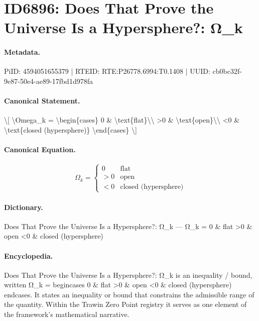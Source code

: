 \section*{ID6896: Does That Prove the Universe Is a Hypersphere?: Ω\_k}
\paragraph{Metadata.}
PiID: 4594051655379 | RTEID: RTE:P26778.6994:T0.1408 | UUID: cb0bc32f-9e87-50e4-ae89-17fbd1d978fa

\paragraph{Canonical Statement.}
\textbackslash{}[ \textbackslash{}Omega\_k = \textbackslash{}begin\{cases\} 0 \& \textbackslash{}text\{flat\}\textbackslash{}\textbackslash{} >0 \& \textbackslash{}text\{open\}\textbackslash{}\textbackslash{} <0 \& \textbackslash{}text\{closed (hypersphere)\} \textbackslash{}end\{cases\} \textbackslash{}]

\paragraph{Canonical Equation.}
\[
\Omega_k = \begin{cases} 0 & \text{flat}\\ >0 & \text{open}\\ <0 & \text{closed (hypersphere)} \end{cases}
\]

\paragraph{Dictionary.}
Does That Prove the Universe Is a Hypersphere?: Ω\_k — Ω\_k = 0 \& flat >0 \& open <0 \& closed (hypersphere)

\paragraph{Encyclopedia.}
Does That Prove the Universe Is a Hypersphere?: Ω\_k is an inequality / bound, written Ω\_k = begincases 0 \& flat >0 \& open <0 \& closed (hypersphere) endcases. It states an inequality or bound that constrains the admissible range of the quantity. Within the Trawin Zero Point registry it serves as one element of the framework's mathematical narrative.
